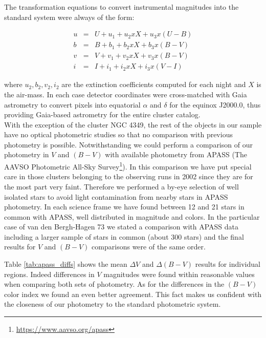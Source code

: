\documentclass[draft]{aa}
\begin{document}
The transformation equations to convert instrumental magnitudes into the
standard system were always of the form:

\begin{eqnarray*}
    u & = & U+u_1+u_2xX+u_3x(U-B) \\
    b & = & B+b_1+b_2xX+b_3x(B-V) \\
    v & = & V+v_1+v_2xX+v_3x(B-V) \\
    i & = & I+i_1+i_2xX+i_3x(V-I)
\end{eqnarray*}

where $u_2, b_2, v_2, i_2$ are the extinction coefficients computed for each
night and $X$ is the air-mass. In each case detector coordinates were
cross-matched with Gaia astrometry to convert pixels into
equatorial $\alpha$ and $\delta$ for the equinox J2000.0, thus providing
Gaia-based astrometry for the entire cluster catalog.\\

With the exception of the cluster NGC 4349, the rest of the objects in our
sample have no optical photometric studies so that no comparison with previous
photometry is possible. Notwithstanding we could perform a comparison of our
photometry in $V$ and $(B-V)$ with available photometry from APASS (The AAVSO
Photometric All-Sky Survey\footnote{\url{https://www.aavso.org/apass}}).
In this comparison we have put special care in those clusters belonging to the
observing runs in 2002 since they are for the most part very faint. Therefore
we performed a by-eye selection of well isolated stars to avoid light
contamination from nearby stars in APASS photometry. In each science frame we
have found between 12 and 21 stars in common with APASS, well distributed in
magnitude and colors.
In the particular case of van den Bergh-Hagen 73 we stated a comparison with
APASS data including a larger sample of stars in common (about 300 stars) and
the final results for $V$ and $(B-V)$ comparisons were of the same order.

Table \ref{tab:apass_diffs} shows the mean $\Delta V$ and $\Delta(B-V)$ results
for individual regions. Indeed differences in $V$ magnitudes were found within
reasonable values when comparing both sets of photometry. As for the
differences in the $(B-V)$ color index we found an even better agreement. This
fact makes us confident with the closeness of our photometry to the standard
photometric system. 
\end{document}
